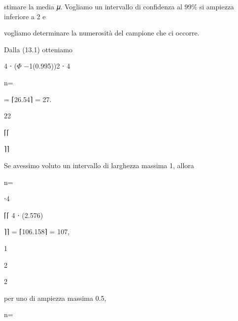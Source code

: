 \documentclass[a4paper,portrait,12pt]{article}
\begin{document}
\begin{flushleft}
stimare la media 𝜇. Vogliamo un intervallo di confidenza al 99\% si ampiezza inferiore a 2 e
\end{flushleft}


\begin{flushleft}
vogliamo determinare la numerosit\`{a} del campione che ci occorre.
\end{flushleft}


\begin{flushleft}
Dalla (13.1) otteniamo
\end{flushleft}


\begin{flushleft}
4 ⋅ ($\Phi$ $-$1(0.995))2 ⋅ 4
\end{flushleft}


\begin{flushleft}
n=
\end{flushleft}


= ⌈26.54⌉ = 27.


22





⌈⌈





⌉⌉





\begin{flushleft}
Se avessimo voluto un intervallo di larghezza massima 1, allora
\end{flushleft}


\begin{flushleft}
n=
\end{flushleft}





⋅4


⌈⌈ 4 ⋅ (2.576)


⌉⌉ = ⌈106.158⌉ = 107,


1


2





2





\begin{flushleft}
per uno di ampiezza massima 0.5,
\end{flushleft}


\begin{flushleft}
n=
\end{flushleft}
\end{document}
